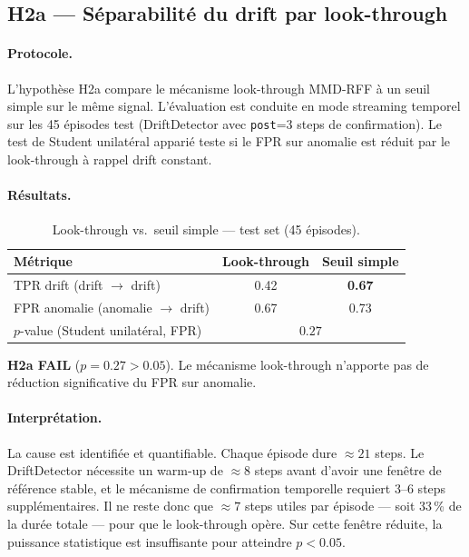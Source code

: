\subsection{H2a --- Séparabilité du drift par look-through}
\label{sec:h2a}

\paragraph{Protocole.}
L'hypothèse H2a compare le mécanisme look-through MMD-RFF à un seuil simple sur le même
signal. L'évaluation est conduite en mode streaming temporel sur les 45 épisodes test
(DriftDetector avec \texttt{post}=3 steps de confirmation).
Le test de Student unilatéral apparié teste si le FPR sur anomalie est réduit par
le look-through à rappel drift constant.

\paragraph{Résultats.}

\begin{table}[h]
\centering
\caption{Look-through vs.\ seuil simple --- test set (45 épisodes).}
\label{tab:h2a}
\begin{tabular}{lcc}
\toprule
\textbf{Métrique} & \textbf{Look-through} & \textbf{Seuil simple} \\
\midrule
TPR drift (drift $\to$ drift)             & 0.42 & \textbf{0.67} \\
FPR anomalie (anomalie $\to$ drift)       & 0.67 & 0.73 \\
$p$-value (Student unilatéral, FPR)       & \multicolumn{2}{c}{$0.27$} \\
\bottomrule
\end{tabular}
\end{table}

\textbf{H2a \xmark{} FAIL} ($p = 0.27 > 0.05$).
Le mécanisme look-through n'apporte pas de réduction significative du FPR sur anomalie.

\paragraph{Interprétation.}
La cause est identifiée et quantifiable. Chaque épisode dure $\approx 21$ steps.
Le DriftDetector nécessite un warm-up de $\approx 8$ steps avant d'avoir une fenêtre
de référence stable, et le mécanisme de confirmation temporelle requiert $3$--$6$ steps
supplémentaires. Il ne reste donc que $\approx 7$ steps utiles par épisode --- soit 33\,\%
de la durée totale --- pour que le look-through opère. Sur cette fenêtre réduite,
la puissance statistique est insuffisante pour atteindre $p < 0.05$.

